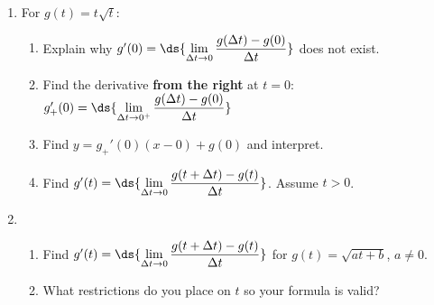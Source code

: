 \documentclass{ximera}
\begin{document}
\begin{enumerate}
\setcounter{enumi}{\value{HW}}

\item  For  $g(t) = t \sqrt{t}$:

\begin{enumerate}

\item  Explain why $g'(0) = \ds{\lim_{\Delta t \rightarrow 0} \dfrac{g(\Delta t) - g(0)}{\Delta t}}$ does not exist.

\item Find the  derivative \textbf{from the right} at $t=0$:  $g_{+}'(0) = \ds{\lim_{\Delta t \rightarrow 0^{+}} \dfrac{g(\Delta t) - g(0)}{\Delta t}}$

\item  Find $y = g_{+}'(0) (x-0) + g(0)$ and interpret.

\item Find  $g'(t) =  \ds{\lim_{\Delta t \rightarrow 0} \dfrac{g(t+\Delta t) - g(t)}{\Delta t}}$.  Assume $t>0$.

\end{enumerate}


\item  \begin{enumerate} \item Find  $g'(t) =  \ds{\lim_{\Delta t \rightarrow 0} \dfrac{g(t+\Delta t) - g(t)}{\Delta t}}$ for  $g(t) = \sqrt{at+b}$, $a \neq 0$. 

\smallskip

\item What restrictions do you place on $t$ so your formula is valid?

\end{enumerate}


\setcounter{HW}{\value{enumi}}
\end{enumerate}
\end{document}
